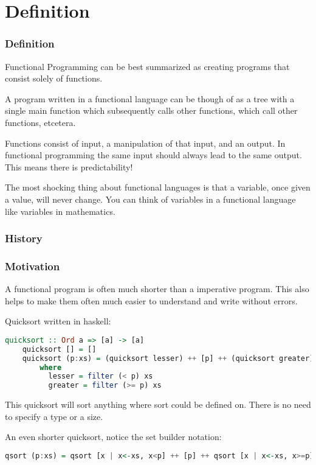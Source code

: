 \documentclass[presentation.tex]{subfiles}
\begin{document}
\section{Definition}
\begin{frame}
  \frametitle{Definition}
  Functional Programming can be best summarized as creating programs that consist solely of functions.

  \vspace{\baselineskip}
  A program written in a functional language can be though of as a tree with a single main function which subsequently calls other functions, which call other functions, etcetera.

  \vspace{\baselineskip}
  Functions consist of input, a manipulation of that input, and an output. In functional programming the same input should always lead to the same output. This means there is predictability!

  \vspace{\baselineskip}
  The most shocking thing about functional languages is that a variable, once given a value, will never change. You can think of variables in a functional language like variables in mathematics. %

\end{frame}


\begin{frame}
  \frametitle{History}
\end{frame}


\begin{frame}[fragile]
  \frametitle{Motivation}
  A functional program is often much shorter than a imperative program. This also helps to make them often much easier to understand and write without errors.

  \vspace{\baselineskip}
  Quicksort written in haskell:

  \begin{lstlisting}[language=Haskell]
    quicksort :: Ord a => [a] -> [a]
    quicksort [] = []
    quicksort (p:xs) = (quicksort lesser) ++ [p] ++ (quicksort greater)
        where
          lesser = filter (< p) xs
          greater = filter (>= p) xs
  \end{lstlisting}

  \vspace{\baselineskip}
  This quicksort will sort anything where sort could be defined on. There is no need to specify a type or a size.
\end{frame}

\begin{frame}[fragile]
  \vspace{\baselineskip}
  An even shorter quicksort, notice the set builder notation:

  \begin{lstlisting}[language=Haskell]
    qsort (p:xs) = qsort [x | x<-xs, x<p] ++ [p] ++ qsort [x | x<-xs, x>=p]
  \end{lstlisting}
\end{frame}
\end{document}
